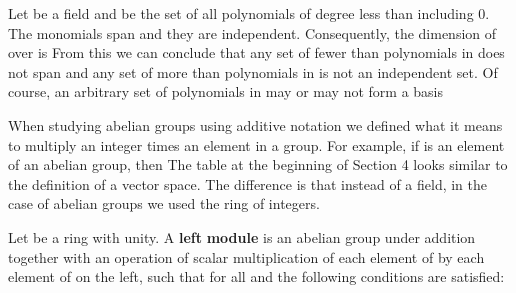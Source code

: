 \documentclass[11pt,oneside]{article}
\begin{document}
\begin{BookBody}
 Let  be a field and  be the set of all polynomials of degree less than  including 0. The monomials  span  and they are independent. Consequently, the dimension of  over  is  From this we can conclude that any set of fewer than  polynomials in  does not span  and any set of more than  polynomials in  is not an independent set. Of course, an arbitrary set of  polynomials in  may or may not form a basis\BookEnd{\blacktriangle}


\noindent When studying abelian groups using additive notation we defined what it means to multiply an integer times an element in a group. For example, if  is an element of an abelian group, then  The table at the beginning of Section 4 looks similar to the definition of a vector space. The difference is that instead of a field, in the case of abelian groups we used the ring of integers.

 Let  be a ring with unity. A\textbf{ left} \textbf{module} is an abelian group  under addition together with an operation of scalar multiplication of each element of  by each element 
of  on the left, such that for all  and  the following conditions are satisfied:

\end{BookBody}

\BookNarrativetrue
\end{document}

